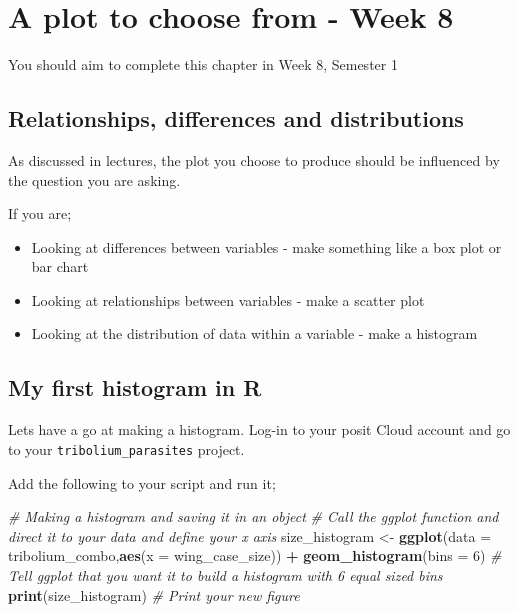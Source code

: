 \documentclass[
]{book}
\newenvironment{Shaded}{\begin{snugshade}}{\end{snugshade}}
\newcommand{\AttributeTok}[1]{\textcolor[rgb]{0.13,0.29,0.53}{#1}}
\newcommand{\CommentTok}[1]{\textcolor[rgb]{0.56,0.35,0.01}{\textit{#1}}}
\newcommand{\DecValTok}[1]{\textcolor[rgb]{0.00,0.00,0.81}{#1}}
\newcommand{\FunctionTok}[1]{\textcolor[rgb]{0.13,0.29,0.53}{\textbf{#1}}}
\newcommand{\NormalTok}[1]{#1}
\newcommand{\OtherTok}[1]{\textcolor[rgb]{0.56,0.35,0.01}{#1}}
\newcommand{\SpecialCharTok}[1]{\textcolor[rgb]{0.81,0.36,0.00}{\textbf{#1}}}
\providecommand{\tightlist}{%
  \setlength{\itemsep}{0pt}\setlength{\parskip}{0pt}}
\begin{document}
\chapter{A plot to choose from - Week 8}\label{histogram}

You should aim to complete this chapter in Week 8, Semester 1

\section{Relationships, differences and distributions}\label{relationships-differences-and-distributions}

As discussed in lectures, the plot you choose to produce should be influenced by the question you are asking.

If you are;

\begin{itemize}
\tightlist
\item
  Looking at differences between variables - make something like a box plot or bar chart
\item
  Looking at relationships between variables - make a scatter plot
\item
  Looking at the distribution of data within a variable - make a histogram
\end{itemize}

\section{My first histogram in R}\label{my-first-histogram-in-r}

Lets have a go at making a histogram. Log-in to your posit Cloud account and go to your \texttt{tribolium\_parasites} project.

Add the following to your script and run it;

\begin{Shaded}
\begin{Highlighting}[]
\CommentTok{\# Making a histogram and saving it in an object}
\CommentTok{\# Call the ggplot function and direct it to your data and define your x axis}
\NormalTok{size\_histogram }\OtherTok{\textless{}{-}} \FunctionTok{ggplot}\NormalTok{(}\AttributeTok{data =}\NormalTok{ tribolium\_combo,}\FunctionTok{aes}\NormalTok{(}\AttributeTok{x =}\NormalTok{ wing\_case\_size)) }\SpecialCharTok{+} 
  \FunctionTok{geom\_histogram}\NormalTok{(}\AttributeTok{bins =} \DecValTok{6}\NormalTok{) }\CommentTok{\# Tell ggplot that you want it to build a histogram with 6 equal sized bins}
\FunctionTok{print}\NormalTok{(size\_histogram) }\CommentTok{\# Print your new figure}
\end{Highlighting}
\end{Shaded}
\end{document}
